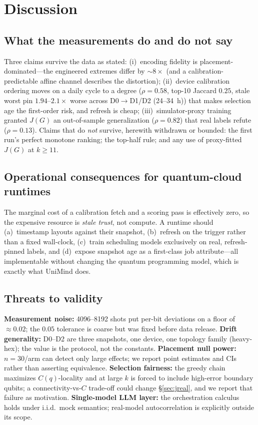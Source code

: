 \documentclass[journal,10pt,twocolumn]{IEEEtran}
\begin{document}
\section{Discussion}
\label{sec:discussion}
\subsection{What the measurements do and do not say}
Three claims survive the data as stated: (i)~encoding fidelity is placement-dominated---the engineered extremes
differ by $\sim8\times$ (and a calibration-predictable affine channel describes the distortion); (ii)~device
calibration ordering moves on a daily cycle to a degree ($\rho{=}0.58$, top-10 Jaccard $0.25$, stale worst pin
$1.94$--$2.1\times$ worse across D0$\to$D1/D2 (24--34~h)) that makes selection age the first-order risk, and
refresh is cheap; (iii)~simulator-proxy
training granted $J(G)$ an out-of-sample generalization ($\rho{=}0.82$) that real labels refute
($\rho{=}0.13$). Claims that do \emph{not} survive, herewith withdrawn or bounded: the first run's perfect monotone
ranking; the top-half rule; and any use of proxy-fitted $J(G)$ at $k\ge11$.

\subsection{Operational consequences for quantum-cloud runtimes}
The marginal cost of a calibration fetch and a scoring pass is effectively zero, so the expensive resource is
\emph{stale trust}, not compute. A runtime should (a)~timestamp layouts against their snapshot, (b)~refresh on the
trigger rather than a fixed wall-clock, (c)~train scheduling models exclusively on real, refresh-pinned labels, and
(d)~expose snapshot age as a first-class job attribute---all implementable without changing the quantum programming
model, which is exactly what UniMind does.

\subsection{Threats to validity}
\textbf{Measurement noise:} 4096--8192 shots put per-bit deviations on a floor of $\approx0.02$; the $0.05$
tolerance is coarse but was fixed before data release. \textbf{Drift generality:} D0--D2 are three snapshots, one
device, one topology family (heavy-hex); the value is the protocol, not the constants. \textbf{Placement null
power:} $n{=}30$/arm can detect only large effects; we report point estimates and CIs rather than asserting
equivalence. \textbf{Selection fairness:} the greedy chain maximizes $C(q)$-locality and at large $k$ is forced to
include high-error boundary qubits; a connectivity-vs-$C$ trade-off could change \S\ref{sec:jreal}, and we report
that failure as motivation. \textbf{Single-model LLM layer:} the orchestration calculus holds under i.i.d.\ mock
semantics; real-model autocorrelation is explicitly outside its scope.
\end{document}
